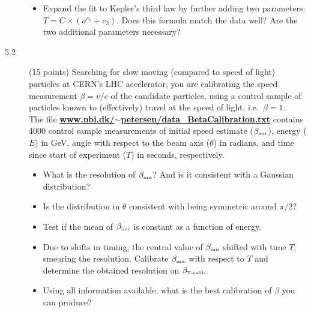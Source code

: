 \documentclass[11pt]{article}
\begin{document}
\begin{description}
\begin{itemize}
    \item Expand the fit to Kepler's third law by further adding two parameters:
      $T = C \times (a^{c_1} + c_2)$. Does this formula match the data well?
      Are the two additional parameters necessary?
  \end{itemize}
\item[5.2] (15 points) 
  Searching for slow moving (compared to speed of light) particles at CERN's LHC accelerator, you are calibrating
  the speed measurement $\beta = v/c$ of the candidate particles, using a control sample of particles known to
  (effectively) travel at the speed of light, i.e.\ $\beta = 1$.\\
  The file
  \href{http://www.nbi.dk/~petersen/data\_BetaCalibration.txt}{\bf www.nbi.dk/$\sim$petersen/data\_BetaCalibration.txt}
  contains 4000 control sample measurements of initial speed estimate ($\beta_{\mbox{\tiny init}}$), energy ($E$) in GeV,
  angle with respect to the beam axis ($\theta$) in radians, and time since start of experiment ($T$) in seconds,
  respectively.
  \vspace{-1.0ex}
  \begin{itemize}
    \item What is the resolution of $\beta_{\mbox{\tiny init}}$? And is it consistent with a Gaussian distribution?
    \item Is the distribution in $\theta$ consistent with being symmetric around $\pi/2$?
    \item Test if the mean of $\beta_{\mbox{\tiny init}}$ is constant as a function of energy.
    \item Due to shifts in timing, the central value of $\beta_{\mbox{\tiny init}}$ shifted with time $T$,
      smearing the resolution. Calibrate $\beta_{\mbox{\tiny init}}$ with respect to $T$ and determine
      the obtained resolution on $\beta_{\mbox{\tiny T-calib}}$.
    \item Using all information available, what is the best calibration of $\beta$ you can produce?
  \end{itemize}
\vspace*{-2ex}
\end{description}


\end{document}
